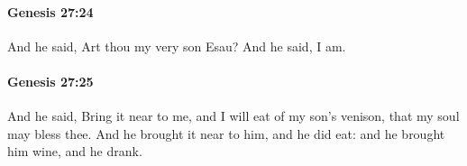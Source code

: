 		\paragraph{Genesis 27:24} %
			\label{GENESIS-27-24}

			And he said, Art thou my very son Esau? And he said, I am.


		\paragraph{Genesis 27:25} %
			\label{GENESIS-27-25}

			And he said, Bring it near to me, and I will eat of my son's venison, that my soul may bless thee. And he brought it near to him, and he did eat: and he brought him wine, and he drank.


